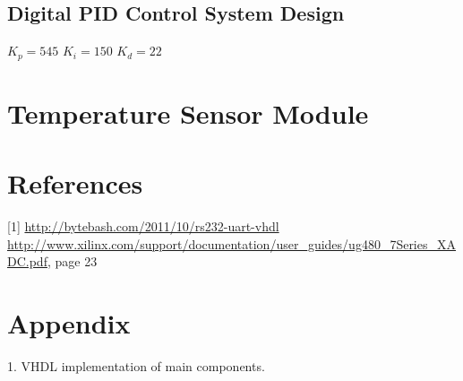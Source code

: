 \documentclass{article}
\begin{document}
\subsection{Digital PID Control System Design}
\begin{center}
$K_p=545$	$K_i=150$	$K_d=22$
\end{center}
\section{Temperature Sensor Module}

\section{References}

[1] \url{http://bytebash.com/2011/10/rs232-uart-vhdl} \newline
[2] \url{http://www.xilinx.com/support/documentation/user_guides/ug480_7Series_XADC.pdf}, page 23

\section{Appendix}
1. VHDL implementation of main components.
\end{document}
